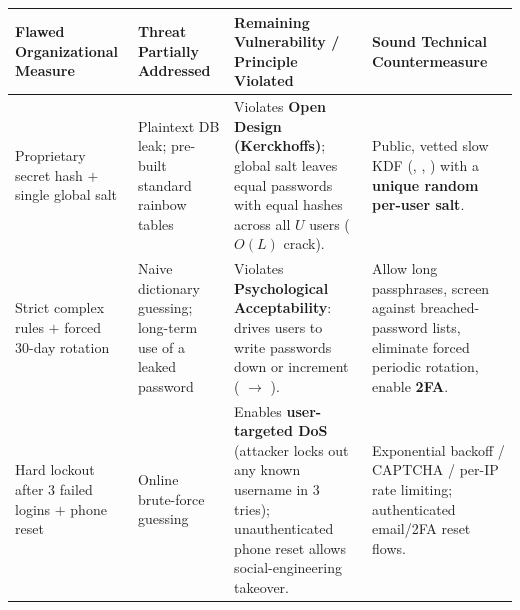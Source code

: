 \begin{table}[h!]
\centering
\footnotesize
\begin{tabularx}{\textwidth}{@{}L{3.2cm} L{3.0cm} Y Y@{}}
\toprule
\textbf{Flawed Organizational Measure} & \textbf{Threat Partially Addressed} & \textbf{Remaining Vulnerability / Principle Violated} & \textbf{Sound Technical Countermeasure} \\
\midrule
Proprietary secret hash $+$ single global salt & Plaintext DB leak; pre-built standard rainbow tables & Violates \textbf{Open Design (Kerckhoffs)}; global salt leaves equal passwords with equal hashes across all $U$ users ($O(L)$ crack). & Public, vetted slow KDF (, , ) with a \textbf{unique random per-user salt}. \\
Strict complex rules $+$ forced 30-day rotation & Naive dictionary guessing; long-term use of a leaked password & Violates \textbf{Psychological Acceptability}: drives users to write passwords down or increment ( $\to$ ). & Allow long passphrases, screen against breached-password lists, eliminate forced periodic rotation, enable \textbf{2FA}. \\
Hard lockout after 3 failed logins $+$ phone reset & Online brute-force guessing & Enables \textbf{user-targeted DoS} (attacker locks out any known username in 3 tries); unauthenticated phone reset allows social-engineering takeover. & Exponential backoff / CAPTCHA / per-IP rate limiting; authenticated email/2FA reset flows. \\
\bottomrule
\end{tabularx}
\end{table}

